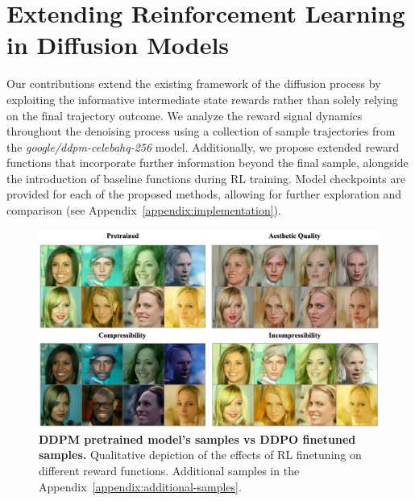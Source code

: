 \chapter{Extending Reinforcement Learning in Diffusion Models}



Our contributions extend the existing framework of the diffusion process by exploiting the informative intermediate state rewards rather than solely relying on the final trajectory outcome. We analyze the reward signal dynamics throughout the denoising process using a collection of sample trajectories from the \textit{google/ddpm-celebahq-256} model. Additionally, we propose extended reward functions that incorporate further information beyond the final sample, alongside the introduction of baseline functions during RL training. Model checkpoints are provided for each of the proposed methods, allowing for further exploration and comparison (see Appendix~\ref{appendix:implementation}). \\


\begin{figure}[ht]
  \centering
  \includegraphics[scale=0.72]{img/results/visual-comparison-results-200dpi.png}
  \vspace{-4pt}  %
    \captionsetup{width=\textwidth} %
    \caption{\textbf{DDPM pretrained model's samples vs DDPO finetuned samples.} Qualitative depiction of the effects of RL finetuning on different reward functions. Additional samples in the Appendix~\ref{appendix:additional-samples}.}
    \label{fig:visual-comparison-ddpo}
\end{figure}

